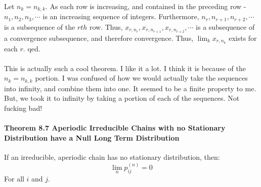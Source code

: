 \documentclass[12pt,a4paper]{article}
\newcommand{\1}[1]{\mathbbm{1}\left\{ #1 \right\}}
\begin{document}
Let $n_k = n_{k,k}$. As each row is increasing, and contained in the preceding row - $n_1, n_2, n_3, \cdots$ is an increasing sequence of integers. Furthermore, $n_r, n_{r+1}, n_{r+2}, \cdots$ is a subsequence of the $rth$ row. Thus, $x_{r, n_r}, x_{r, n_{r+1}}, x_{r, n_{r+2}}, \cdots$ is a subsequence of a convergence subsequence, and therefore convergence. Thus, $\lim_k x_{r,n_k}$ exists for each $r$. qed.
\\\\
This is actually such a cool theorem. I like it a lot. I think it is because of the $n_k = n_{k,k}$ portion. I was confused of how we would actually take the sequences into infinity, and combine them into one. It seemed to be a finite property to me. But, we took it to infinity by taking a portion of each of the sequences. Not fucking bad!

\paragraph{Theorem 8.7 Aperiodic Irreducible Chains with no Stationary Distribution have a Null Long Term Distribution} If an irreducible, aperiodic chain has no stationary distribution, then:
$$
	\lim_n p_{ij}^{(n)} = 0
$$
For all $i$ and $j$.
\end{document}
